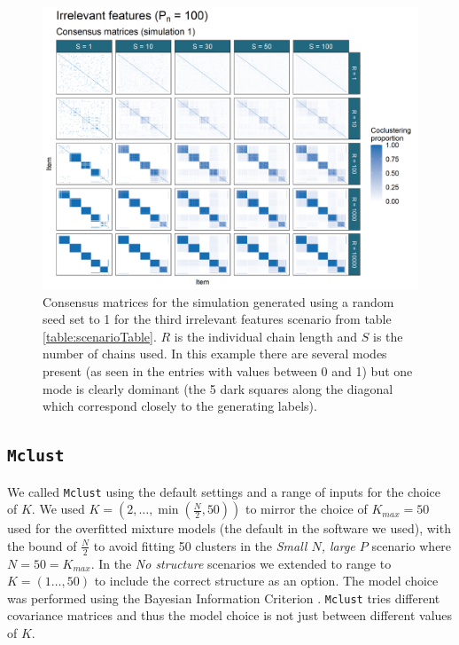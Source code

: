 \documentclass[]{article}
\begin{document}
\begin{figure} %
	\centering
	\includegraphics[scale=0.65]{./Images/Simulations/CMs/irrelevant_features_100Sim1.png}
	\caption{Consensus matrices for the simulation generated using a random seed set to 1 for the third irrelevant features scenario from table \ref{table:scenarioTable}. $R$ is the individual chain length and $S$ is the number of chains used. In this example there are several modes present (as seen in the entries with values between 0 and 1) but one mode is clearly dominant (the 5 dark  squares along the diagonal which correspond closely to the generating labels).}
	\label{fig:simCMsIrr100}
\end{figure}


\subsection{\texttt{Mclust}}
We called \texttt{Mclust} using the default settings and a range of inputs for the choice of $K$. We used $K = (2, \ldots, \min(\frac{N}{2}, 50))$ to mirror the choice of $K_{max}=50$ used for the overfitted mixture models (the default in the software we used), with the bound of $\frac{N}{2}$ to avoid fitting 50 clusters in the \emph{Small $N$, large $P$} scenario where $N=50=K_{max}$. In the \emph{No structure} scenarios we extended to range to $K = (1 \ldots, 50)$ to include the correct structure as an option. The model choice was performed using the Bayesian Information Criterion \citep[][as implemented in \texttt{Mclust}]{schwarz1978estimating}. \texttt{Mclust} tries different covariance matrices and thus the model choice is not just between different values of $K$.
\end{document}
